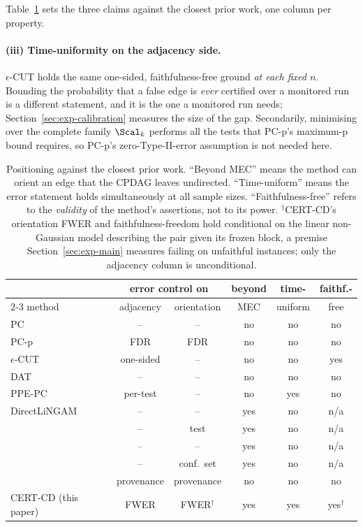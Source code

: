 Table~\ref{tab:related} sets the three claims against the closest prior work,
one column per property.

\paragraph{(iii) Time-uniformity on the adjacency side.} $\epsilon$-CUT
\citep{shaska2025causal} holds the same one-sided, faithfulness-free ground
\emph{at each fixed $n$}. Bounding the probability that a false edge is
\emph{ever} certified over a monitored run is a different statement, and it is
the one a monitored run needs; Section~\ref{sec:exp-calibration} measures the
size of the gap. Secondarily, minimising over the complete family $\Scal_k$
performs all the tests that PC-p's maximum-p bound requires, so PC-p's
zero-Type-II-error assumption is not needed here.

\begin{table}[t]
\centering
\caption{Positioning against the closest prior work. ``Beyond MEC'' means the
method can orient an edge that the CPDAG leaves undirected. ``Time-uniform'' means the
error statement holds simultaneously at all sample sizes.
``Faithfulness-free'' refers to the \emph{validity} of the method's
assertions, not to its power. $^\dagger$CERT-CD's orientation FWER and
faithfulness-freedom hold conditional on the linear non-Gaussian model
describing the pair given its frozen block, a premise Section~\ref{sec:exp-main}
measures failing on unfaithful instances; only the adjacency
column is unconditional.}\label{tab:related}
\footnotesize
\begin{tabular}{@{}lccccc@{}}
\toprule
& \multicolumn{2}{c}{error control on} & beyond & time- & faithf.- \\
\cmidrule(lr){2-3}
method & adjacency & orientation & MEC & uniform & free \\
\midrule
PC \citep{spirtes2000causation}      & --  & --  & no  & no  & no  \\
PC-p \citep{strobl2019estimating}    & FDR & FDR & no  & no  & no  \\
$\epsilon$-CUT \citep{shaska2025causal} & one-sided & -- & no & no & yes \\
DAT \citep{amin2024scalable}         & --  & --  & no  & no  & no  \\
PPE-PC \citep{csillag2025prediction} & per-test & -- & no & yes & no \\
DirectLiNGAM \citep{shimizu2011directlingam} & -- & -- & yes & no & n/a \\
\citet{shimizu2008use}               & --  & test & yes & no  & n/a \\
\citet{ruiz2022sequentially}         & --  & --  & yes & no  & n/a \\
\citet{strieder2023confidence}       & --  & conf.\ set & yes & no & n/a \\
\citet{uehara2026iterative}          & provenance & provenance & no & no & no \\
\midrule
CERT-CD (this paper)                 & FWER & FWER$^\dagger$ & yes & yes & yes$^\dagger$ \\
\bottomrule
\end{tabular}
\end{table}

